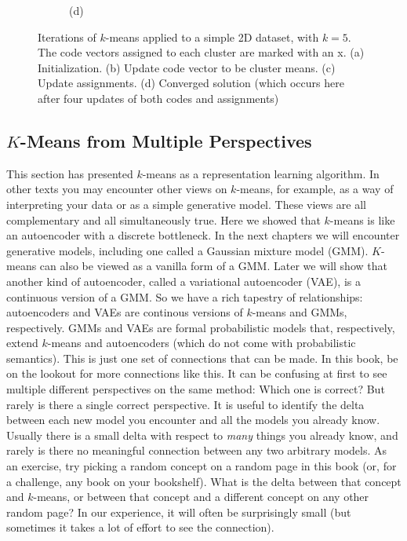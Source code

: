 \begin{figure}[t]
{\begin{subfigure}{0.25\textwidth}
    \caption*{(d)}
  \end{subfigure}%
  }
    \caption{Iterations of $k$-means applied to a simple 2D dataset, with $k=5$. The code vectors assigned to each cluster are marked with an x. (a) Initialization. (b) Update code vector to be cluster means. (c) Update assignments. (d) Converged solution (which occurs here after four updates of both codes and assignments)}
    \label{fig:representation_learning:kmeans_ex}
\end{figure}

\subsection{$K$-Means from Multiple Perspectives}
This section has presented $k$-means as a representation learning algorithm. In other texts you may encounter other views on $k$-means, for example, as a way of interpreting your data or as a simple generative model. These views are all complementary and all simultaneously true. Here we showed that $k$-means is like an autoencoder with a discrete bottleneck. In the next chapters we will encounter generative models, including one called a Gaussian mixture model (GMM). $K$-means can also be viewed as a vanilla form of a GMM. Later we will show that another kind of autoencoder, called a variational autoencoder (VAE), is a continuous version of a GMM. So we have a rich tapestry of relationships: autoencoders and VAEs are continous versions of $k$-means and GMMs, respectively. GMMs and VAEs are formal probabilistic models that, respectively, extend $k$-means and autoencoders (which do not come with probabilistic semantics). This is just one set of connections that can be made. In this book, be on the lookout for more connections like this. It can be confusing at first to see multiple different perspectives on the same method: Which one is correct? But rarely is there a single correct perspective. It is useful to identify the delta between each new model you encounter and all the models you already know. Usually there is a small delta with respect to \textit{many} things you already know, and rarely is there no meaningful connection between any two arbitrary models. As an exercise, try picking a random concept on a random page in this book (or, for a challenge, any book on your bookshelf). What is the delta between that concept and $k$-means, or between that concept and a different concept on any other random page? In our experience, it will often be surprisingly small (but sometimes it takes a lot of effort to see the connection).

